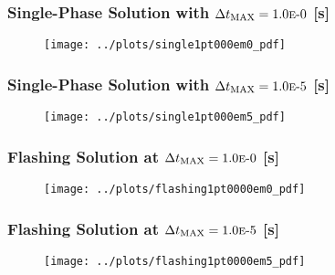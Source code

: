 \documentclass[compress,xcolor=table]{beamer}
\begin{document}
\begin{frame}
\frametitle{Single-Phase Solution with $\dtmax{} = \expneg{1.0}{0}$ [s]}

\begin{figure}[h!t]
\centering
\texttt{[image: ../plots/single1pt000em0\_pdf]}
\end{figure}

\end{frame}
\begin{frame}
\frametitle{Single-Phase Solution with $\dtmax{} = \expneg{1.0}{5}$ [s]}

\begin{figure}[h!t]
\centering
\texttt{[image: ../plots/single1pt000em5\_pdf]}
\end{figure}


\end{frame}
\begin{frame}
\frametitle{Flashing Solution at $\dtmax{} = \expneg{1.0}{0}$ [s]}

\begin{figure}[h!t]
\centering
\texttt{[image: ../plots/flashing1pt0000em0\_pdf]}
\end{figure}

\end{frame}
\begin{frame}
\frametitle{Flashing Solution at $\dtmax{} = \expneg{1.0}{5}$ [s]}

\begin{figure}[h!t]
\centering
\texttt{[image: ../plots/flashing1pt0000em5\_pdf]}
\end{figure}


\end{frame}
\end{document}
